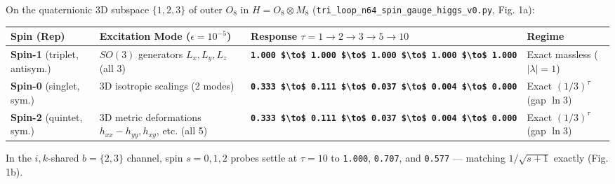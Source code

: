\documentclass[
  a4paper,
]{article}
\newcounter{none} %
\begin{document}
On the quaternionic 3D subspace \(\{1, 2, 3\}\) of outer \(O_8\) in
\(H = O_8 \otimes M_8\)
(\texttt{tri\_\allowbreak{}loop\_\allowbreak{}n64\_\allowbreak{}spin\_\allowbreak{}gauge\_\allowbreak{}higgs\_\allowbreak{}v0.py}, Fig. 1a):

{\def\LTcaptype{none} %
\begin{longtable}[]{@{}
  >{\raggedright\arraybackslash}p{}
  >{\raggedright\arraybackslash}p{}
  >{\raggedright\arraybackslash}p{}
  >{\raggedright\arraybackslash}p{}@{}}
\toprule\noalign{}
\begin{minipage}[b]{\linewidth}\raggedright
Spin (Rep)
\end{minipage} & \begin{minipage}[b]{\linewidth}\raggedright
Excitation Mode (\(\epsilon = 10^{-5}\))
\end{minipage} & \begin{minipage}[b]{\linewidth}\raggedright
Response \(\tau = 1 \to 2 \to 3 \to 5 \to 10\)
\end{minipage} & \begin{minipage}[b]{\linewidth}\raggedright
Regime
\end{minipage} \\
\midrule\noalign{}
\endhead
\bottomrule\noalign{}
\endlastfoot
\textbf{Spin-1} (triplet, antisym.) & \(SO(3)\) generators
\(L_x, L_y, L_z\) (all 3) &
\textbf{\texttt{1.000\ \$\textbackslash{}to\$\ 1.000\ \$\textbackslash{}to\$\ 1.000\ \$\textbackslash{}to\$\ 1.000\ \$\textbackslash{}to\$\ 1.000}}
& Exact massless (\(|\lambda|=1\)) \\
\textbf{Spin-0} (singlet, sym.) & 3D isotropic scalings (2 modes) &
\textbf{\texttt{0.333\ \$\textbackslash{}to\$\ 0.111\ \$\textbackslash{}to\$\ 0.037\ \$\textbackslash{}to\$\ 0.004\ \$\textbackslash{}to\$\ 0.000}}
& Exact \((1/3)^\tau\) (gap \(\ln 3\)) \\
\textbf{Spin-2} (quintet, sym.) & 3D metric deformations
\(h_{xx}-h_{yy}, h_{xy}\), etc. (all 5) &
\textbf{\texttt{0.333\ \$\textbackslash{}to\$\ 0.111\ \$\textbackslash{}to\$\ 0.037\ \$\textbackslash{}to\$\ 0.004\ \$\textbackslash{}to\$\ 0.000}}
& Exact \((1/3)^\tau\) (gap \(\ln 3\)) \\
\end{longtable}
}

In the \(i,k\)-shared \(b=\{2,3\}\) channel, spin \(s = 0, 1, 2\) probes
settle at \(\tau = 10\) to \texttt{1.000}, \texttt{0.707}, and
\texttt{0.577} --- matching \textbf{\(1/\sqrt{s+1}\)} exactly (Fig. 1b).
\end{document}
